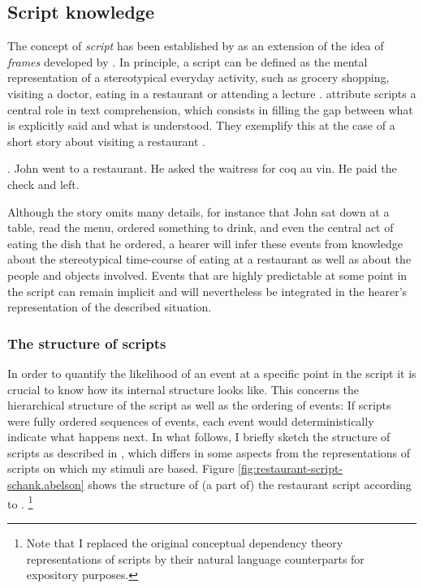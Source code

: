 \subsection{Script knowledge} \label{sec:infotheory-scripts-scrkn}
The concept of \textit{script} has been established by \citet{schank.abelson1977} as an extension of the idea of \textit{frames} developed by \citet{minsky1974}. In principle, a script can be defined as the mental representation of a stereotypical everyday activity, such as grocery shopping, visiting a doctor, eating in a restaurant or attending a lecture \citep{bower.etal1979}. \citet{schank.abelson1977} attribute scripts a central role in text comprehension, which consists in filling the gap between what is explicitly said and what is understood. They exemplify this at the case of a short story about visiting a restaurant \Next. 

\ex. John went to a restaurant. He asked the waitress for coq au vin. He paid the check and left. \hfill \citep[38]{schank.abelson1977} \label{ex:scripts-restaurant-ex}

Although the story omits many details, for instance that John sat down at a table, read the menu, ordered something to drink, and even the central act of eating the dish that he ordered, a hearer will infer these events from knowledge about the stereotypical time-course of eating at a restaurant as well as about the people and objects involved. Events that are highly predictable at some point in the script can remain implicit and will nevertheless be integrated in the hearer's representation of the described situation.

\subsubsection{The structure of scripts}
In order to quantify the likelihood of an event at a specific point in the script it is crucial to know how its internal structure looks like. This concerns the hierarchical structure of the script as well as the ordering of events: If scripts were fully ordered sequences of events, each event would deterministically indicate what happens next. In what follows, I briefly sketch the structure of scripts as described in \citet{schank.abelson1977}, which differs in some aspects from the representations of scripts on which my stimuli are based. Figure \ref{fig:restaurant-script-schank.abelson} shows the structure of (a part of) the restaurant script according to \citet{schank.abelson1977}.%
% 
\footnote{Note that I replaced the original conceptual dependency theory \citep{schank1975} representations of scripts by their natural language counterparts for expository purposes.}\afterfn%
%

